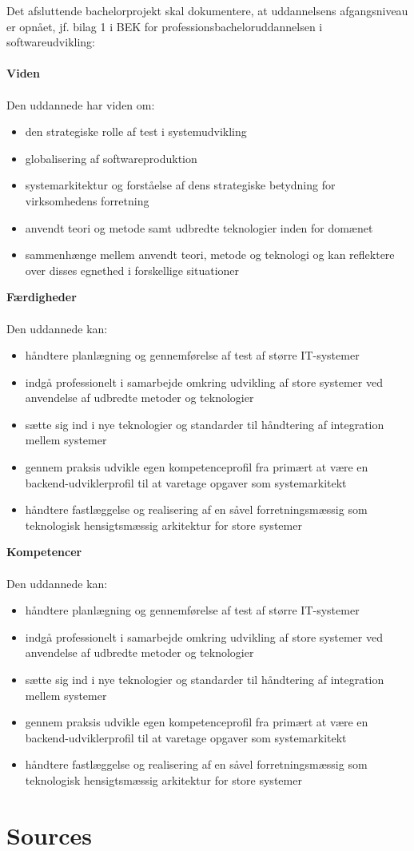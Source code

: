 \documentclass[a4paper,12pt]{article}
\begin{document}
Det afsluttende bachelorprojekt skal dokumentere, at uddannelsens afgangsniveau er opnået, jf. bilag 1 i BEK for professionsbacheloruddannelsen i softwareudvikling: \\
\\
\textbf{Viden} \\ \\
Den uddannede har viden om:
\begin{itemize}
\item den strategiske rolle af test i systemudvikling
\item globalisering af softwareproduktion
\item systemarkitektur og forståelse af dens strategiske betydning for virksomhedens forretning
\item anvendt teori og metode samt udbredte teknologier inden for domænet
\item sammenhænge mellem anvendt teori, metode og teknologi og kan reflektere over disses egnethed i forskellige situationer
\end{itemize}
\vspace{1cm}
\textbf{Færdigheder}  \\ \\
Den uddannede kan:
\begin{itemize}
\item håndtere planlægning og gennemførelse af test af større IT-systemer
\item indgå professionelt i samarbejde omkring udvikling af store systemer ved anvendelse af udbredte metoder og teknologier
\item sætte sig ind i nye teknologier og standarder til håndtering af integration mellem systemer

\item gennem praksis udvikle egen kompetenceprofil fra primært at være en backend-udviklerprofil til at varetage opgaver som
systemarkitekt
\item håndtere fastlæggelse og realisering af en såvel forretningsmæssig som teknologisk hensigtsmæssig arkitektur for store systemer

\end{itemize}
\vspace{1cm}
\clearpage
\textbf{Kompetencer} \\
\\
Den uddannede kan:
\begin{itemize}
\item håndtere planlægning og gennemførelse af test af større IT-systemer
\item indgå professionelt i samarbejde omkring udvikling af store systemer ved
anvendelse af udbredte metoder og teknologier
\item sætte sig ind i nye teknologier og standarder til håndtering af integration
mellem systemer
\item gennem praksis udvikle egen kompetenceprofil fra primært at være en
backend-udviklerprofil til at varetage opgaver som systemarkitekt
\item håndtere fastlæggelse og realisering af en såvel forretningsmæssig som
teknologisk hensigtsmæssig arkitektur for store systemer \cite{cphbusiness}
\end{itemize}

\section{Sources}



\printbibliography
\end{document}
